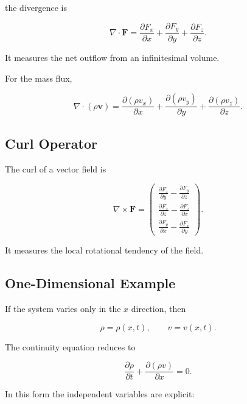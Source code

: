 \documentclass[12pt]{article}
\begin{document}
the divergence is

\begin{equation}
\nabla\cdot\mathbf{F}
=
\frac{\partial F_x}{\partial x}
+
\frac{\partial F_y}{\partial y}
+
\frac{\partial F_z}{\partial z}.
\end{equation}

It measures the net outflow from an infinitesimal volume.

For the mass flux,

\begin{equation}
\nabla\cdot(\rho\mathbf{v})
=
\frac{\partial(\rho v_x)}{\partial x}
+
\frac{\partial(\rho v_y)}{\partial y}
+
\frac{\partial(\rho v_z)}{\partial z}.
\end{equation}

\subsection{Curl Operator}

The curl of a vector field is

\begin{equation}
\nabla\times\mathbf{F}
=
\begin{pmatrix}
\displaystyle
\frac{\partial F_z}{\partial y}
-
\frac{\partial F_y}{\partial z}
\\[2ex]
\displaystyle
\frac{\partial F_x}{\partial z}
-
\frac{\partial F_z}{\partial x}
\\[2ex]
\displaystyle
\frac{\partial F_y}{\partial x}
-
\frac{\partial F_x}{\partial y}
\end{pmatrix}.
\end{equation}

It measures the local rotational tendency of the field.

\subsection{One-Dimensional Example}

If the system varies only in the $x$ direction, then

\[
\rho=\rho(x,t),
\qquad
v=v(x,t).
\]

The continuity equation reduces to

\begin{equation}
\frac{\partial \rho}{\partial t}
+
\frac{\partial(\rho v)}{\partial x}
=
0.
\end{equation}

In this form the independent variables are explicit:
\end{document}
